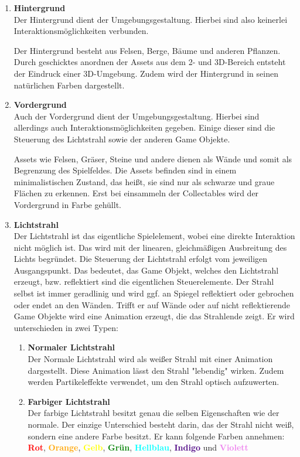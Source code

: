 \begin{enumerate}


\item \textbf{Hintergrund} \hfill \\
Der Hintergrund dient der Umgebungsgestaltung. Hierbei sind also keinerlei Interaktionsmöglichkeiten verbunden. 

Der Hintergrund besteht aus Felsen, Berge, Bäume und anderen Pflanzen. Durch geschicktes anordnen der Assets aus dem 2- und 3D-Bereich entsteht der Eindruck einer 3D-Umgebung. Zudem wird der Hintergrund in seinen natürlichen Farben dargestellt.

\item \textbf{Vordergrund} \hfill \\
Auch der Vordergrund dient der Umgebungsgestaltung. Hierbei sind allerdings auch Interaktionsmöglichkeiten gegeben. Einige dieser sind die Steuerung des Lichtstrahl sowie der anderen Game Objekte.

Assets wie Felsen, Gräser, Steine und andere dienen als Wände und somit als Begrenzung des Spielfeldes. Die Assets befinden sind in einem minimalistischen Zustand, das heißt, sie sind nur als schwarze und graue Flächen zu erkennen. Erst bei einsammeln der Collectables wird der Vordergrund in Farbe gehüllt.

\item \textbf{Lichtstrahl} \hfill \\
Der Lichtstrahl ist das eigentliche Spielelement, wobei eine direkte Interaktion nicht möglich ist. Das wird mit der linearen, gleichmäßigen Ausbreitung des Lichts begründet. Die Steuerung der Lichtstrahl erfolgt vom jeweiligen Ausgangspunkt. Das bedeutet, das Game Objekt, welches den Lichtstrahl erzeugt, bzw. reflektiert sind die eigentlichen Steuerelemente. Der Strahl selbst ist immer geradlinig und wird ggf. an Spiegel reflektiert oder gebrochen oder endet an den Wänden. Trifft er auf Wände oder auf nicht reflektierende Game Objekte wird eine Animation erzeugt, die das Strahlende zeigt. Er wird unterschieden in zwei Typen:
\begin{enumerate}
\item \textbf{Normaler Lichtstrahl} \hfill \\
Der Normale Lichtstrahl wird als weißer Strahl mit einer Animation dargestellt. Diese Animation lässt den Strahl "{}lebendig"{} wirken. Zudem werden Partikeleffekte verwendet, um den Strahl optisch aufzuwerten.
\item \textbf{Farbiger Lichtstrahl} \hfill \\
Der farbige Lichtstrahl besitzt genau die selben Eigenschaften wie der normale. Der einzige Unterschied besteht darin, das der Strahl nicht weiß, sondern eine andere Farbe besitzt. Er kann folgende Farben annehmen: \textcolor{red}{\textbf{Rot}}, \textcolor{orange}{\textbf{Orange}},  \textcolor{yellow}{\textbf{Gelb}}, \textcolor{green}{\textbf{Grün}}, \textcolor{cyan}{\textbf{Hellblau}}, \textcolor{indigo}{\textbf{Indigo}} und \textcolor{violet}{\textbf{Violett}}
\end{enumerate}


\end{enumerate}
